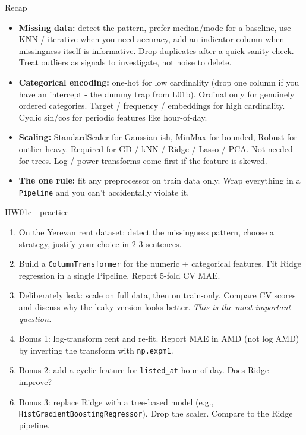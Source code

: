 \documentclass[aspectratio=169]{beamer}
\begin{document}
\begin{frame}{Recap}
  \begin{itemize}
    \item \textbf{Missing data:} detect the pattern, prefer median/mode for a baseline, use KNN / iterative when you need accuracy, add an indicator column when missingness itself is informative. Drop duplicates after a quick sanity check. Treat outliers as signals to investigate, not noise to delete.
    \item \textbf{Categorical encoding:} one-hot for low cardinality (drop one column if you have an intercept - the dummy trap from L01b). Ordinal only for genuinely ordered categories. Target / frequency / embeddings for high cardinality. Cyclic sin/cos for periodic features like hour-of-day.
    \item \textbf{Scaling:} StandardScaler for Gaussian-ish, MinMax for bounded, Robust for outlier-heavy. Required for GD / kNN / Ridge / Lasso / PCA. Not needed for trees. Log / power transforms come first if the feature is skewed.
    \item \textbf{The one rule:} fit any preprocessor on train data only. Wrap everything in a \texttt{Pipeline} and you can't accidentally violate it.
  \end{itemize}
\end{frame}

\begin{frame}{HW01c - practice}
  \begin{enumerate}
    \item On the Yerevan rent dataset: detect the missingness pattern, choose a strategy, justify your choice in 2-3 sentences.
    \item Build a \texttt{ColumnTransformer} for the numeric + categorical features. Fit Ridge regression in a single Pipeline. Report 5-fold CV MAE.
    \item Deliberately leak: scale on full data, then on train-only. Compare CV scores and discuss why the leaky version looks better. \emph{This is the most important question.}
    \item Bonus 1: log-transform rent and re-fit. Report MAE in AMD (not log AMD) by inverting the transform with \texttt{np.expm1}.
    \item Bonus 2: add a cyclic feature for \texttt{listed\_at} hour-of-day. Does Ridge improve?
    \item Bonus 3: replace Ridge with a tree-based model (e.g., \texttt{HistGradientBoostingRegressor}). Drop the scaler. Compare to the Ridge pipeline.
  \end{enumerate}
\end{frame}
\end{document}
